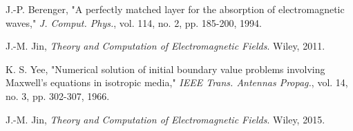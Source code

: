 \documentclass[journal]{IEEEtran}
\begin{document}

\begin{thebibliography}{9}

J.-P. Berenger, "A perfectly matched layer for the absorption of electromagnetic waves," \emph{J. Comput. Phys.}, vol. 114, no. 2, pp. 185-200, 1994.

J.-M. Jin, \emph{Theory and Computation of Electromagnetic Fields}. Wiley, 2011.

K. S. Yee, "Numerical solution of initial boundary value problems involving Maxwell's equations in isotropic media," \emph{IEEE Trans. Antennas Propag.}, vol. 14, no. 3, pp. 302-307, 1966.

J.-M. Jin, \emph{Theory and Computation of Electromagnetic Fields}. Wiley, 2015.
\end{thebibliography}
\end{document}
